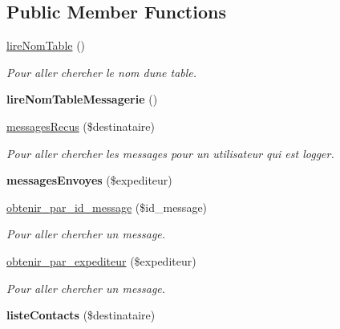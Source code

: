 \subsection*{Public Member Functions}
\begin{DoxyCompactItemize}
\item 
\hyperlink{class_modele_messages_destinataires_ad3f71c65c8a33b4fdeb2373ba3de2722}{lire\+Nom\+Table} ()
\begin{DoxyCompactList}\small\item\em Pour aller chercher le nom d\textquotesingle{}une table. \end{DoxyCompactList}\item 
\mbox{\label{class_modele_messages_destinataires_a42726866126d9cef7aeb55e63bd31ccc}} 
{\bfseries lire\+Nom\+Table\+Messagerie} ()
\item 
\hyperlink{class_modele_messages_destinataires_ac4cb5db977098c6012898e3016c4be39}{messages\+Recus} (\$destinataire)
\begin{DoxyCompactList}\small\item\em Pour aller chercher les messages pour un utilisateur qui est logger. \end{DoxyCompactList}\item 
\mbox{\label{class_modele_messages_destinataires_a4094e61bc883aca47f47c3084857de99}} 
{\bfseries messages\+Envoyes} (\$expediteur)
\item 
\hyperlink{class_modele_messages_destinataires_adbd5b1dbcef064d777717cdbd705b79f}{obtenir\+\_\+par\+\_\+id\+\_\+message} (\$id\+\_\+message)
\begin{DoxyCompactList}\small\item\em Pour aller chercher un message. \end{DoxyCompactList}\item 
\hyperlink{class_modele_messages_destinataires_a2ecb7e51d9c7e8f115fd42c610392a3b}{obtenir\+\_\+par\+\_\+expediteur} (\$expediteur)
\begin{DoxyCompactList}\small\item\em Pour aller chercher un message. \end{DoxyCompactList}\item 
\mbox{\label{class_modele_messages_destinataires_aa269bdbbcac4a434e23c080390535856}} 
{\bfseries liste\+Contacts} (\$destinataire)

\end{DoxyCompactItemize}
